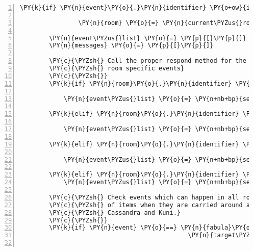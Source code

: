 \begin{Verbatim}[commandchars=\\\{\},numbers=left,firstnumber=1,stepnumber=1]
            \PY{k}{if} \PY{n}{event}\PY{o}{.}\PY{n}{identifier} \PY{o+ow}{in} \PY{n}{current\PYZus{}room}\PY{o}{.}\PY{n}{entity\PYZus{}dict}\PY{o}{.}\PY{n}{keys}\PY{p}{(}\PY{p}{)}\PY{p}{:}

                \PY{n}{room} \PY{o}{=} \PY{n}{current\PYZus{}room}

        \PY{n}{event\PYZus{}list} \PY{o}{=} \PY{p}{[}\PY{p}{]}
        \PY{n}{messages} \PY{o}{=} \PY{p}{[}\PY{p}{]}

        \PY{c}{\PYZsh{} Call the proper respond method for the current room to handle}
        \PY{c}{\PYZsh{} room specific events}
        \PY{c}{\PYZsh{}}
        \PY{k}{if} \PY{n}{room}\PY{o}{.}\PY{n}{identifier} \PY{o}{==} \PY{l+s}{\PYZsq{}}\PY{l+s}{default}\PY{l+s}{\PYZsq{}}\PY{p}{:}

            \PY{n}{event\PYZus{}list} \PY{o}{=} \PY{n+nb+bp}{self}\PY{o}{.}\PY{n}{\PYZus{}respond\PYZus{}room\PYZus{}default}\PY{p}{(}\PY{n}{event}\PY{p}{,} \PY{n}{room}\PY{p}{)}

        \PY{k}{elif} \PY{n}{room}\PY{o}{.}\PY{n}{identifier} \PY{o}{==} \PY{l+s}{\PYZsq{}}\PY{l+s}{room\PYZus{}cassandra}\PY{l+s}{\PYZsq{}}\PY{p}{:}

            \PY{n}{event\PYZus{}list} \PY{o}{=} \PY{n+nb+bp}{self}\PY{o}{.}\PY{n}{\PYZus{}respond\PYZus{}room\PYZus{}cassandra}\PY{p}{(}\PY{n}{event}\PY{p}{,} \PY{n}{room}\PY{p}{)}

        \PY{k}{elif} \PY{n}{room}\PY{o}{.}\PY{n}{identifier} \PY{o}{==} \PY{l+s}{\PYZsq{}}\PY{l+s}{room\PYZus{}kuni}\PY{l+s}{\PYZsq{}}\PY{p}{:}

            \PY{n}{event\PYZus{}list} \PY{o}{=} \PY{n+nb+bp}{self}\PY{o}{.}\PY{n}{\PYZus{}respond\PYZus{}room\PYZus{}kuni}\PY{p}{(}\PY{n}{event}\PY{p}{,} \PY{n}{room}\PY{p}{)}

        \PY{k}{elif} \PY{n}{room}\PY{o}{.}\PY{n}{identifier} \PY{o}{==} \PY{l+s}{\PYZsq{}}\PY{l+s}{room\PYZus{}entry}\PY{l+s}{\PYZsq{}}\PY{p}{:}
            \PY{n}{event\PYZus{}list} \PY{o}{=} \PY{n+nb+bp}{self}\PY{o}{.}\PY{n}{\PYZus{}respond\PYZus{}room\PYZus{}entry}\PY{p}{(}\PY{n}{event}\PY{p}{,} \PY{n}{room}\PY{p}{)}

        \PY{c}{\PYZsh{} Check events which can happen in all rooms for example perception}
        \PY{c}{\PYZsh{} of items when they are carried around and SaysEvents between}
        \PY{c}{\PYZsh{} Cassandra and Kuni.}
        \PY{c}{\PYZsh{}}
        \PY{k}{if} \PY{n}{event} \PY{o}{==} \PY{n}{fabula}\PY{o}{.}\PY{n}{TriesToTalkToEvent}\PY{p}{(}\PY{n}{identifier}\PY{o}{=}\PY{n}{ID\PYZus{}KUNI}\PY{p}{,}
                                              \PY{n}{target\PYZus{}identifier}\PY{o}{=}\PY{n}{ID\PYZus{}CASSANDRA}\PY{p}{)}\PY{p}{:}


\end{Verbatim}
